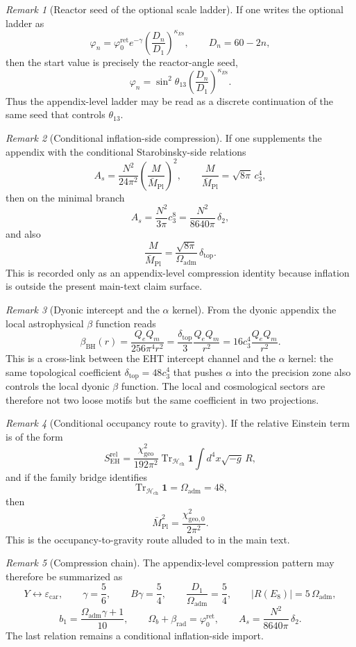 \documentclass[11pt,a4paper]{article}
\theoremstyle{definition}
\theoremstyle{remark}
\newtheorem*{remark}{Remark}
\DeclareMathOperator{\tr}{Tr}
\newcommand{\epscar}{\varepsilon_{\mathrm{car}}}
\newcommand{\Mpl}{\bar M_{\mathrm{Pl}}}
\newcommand{\cthree}{c_3}
\newcommand{\phiz}{\varphi_0^{\mathrm{ret}}}
\newcommand{\deltatop}{\delta_{\mathrm{top}}}
\newcommand{\bone}{b_1}
\newcommand{\Oadm}{\Omega_{\mathrm{adm}}}
\newcommand{\chigeo}{\chi_{\mathrm{geo}}}
\newcommand{\chigeozero}{\chi_{\mathrm{geo},0}}
\begin{document}
\begin{remark}[Reactor seed of the optional scale ladder]
If one writes the optional ladder as
\[
\varphi_n=\phiz e^{-\gamma}\left(\frac{D_n}{D_1}\right)^{\kappa_{E8}},
\qquad
D_n=60-2n,
\]
then the start value is precisely the reactor-angle seed,
\[
\varphi_n=\sin^2\theta_{13}\left(\frac{D_n}{D_1}\right)^{\kappa_{E8}}.
\]
Thus the appendix-level ladder may be read as a discrete continuation of the same seed that controls $\theta_{13}$.
\end{remark}

\begin{remark}[Conditional inflation-side compression]
If one supplements the appendix with the conditional Starobinsky-side relations
\[
A_s=\frac{N^2}{24\pi^2}\left(\frac{M}{\Mpl}\right)^2,
\qquad
\frac{M}{\Mpl}=\sqrt{8\pi}\,\cthree^4,
\]
then on the minimal branch
\[
A_s=\frac{N^2}{3\pi}\cthree^8=\frac{N^2}{8640\pi}\,\delta_2,
\]
and also
\[
\frac{M}{\Mpl}=\frac{\sqrt{8\pi}}{\Oadm}\,\deltatop.
\]
This is recorded only as an appendix-level compression identity because inflation is outside the present main-text claim surface.
\end{remark}

\begin{remark}[Dyonic intercept and the $\alpha$ kernel]
From the dyonic appendix the local astrophysical $\beta$ function reads
\[
\beta_{\mathrm{BH}}(r)=\frac{Q_eQ_m}{256\pi^4 r^2}=\frac{\deltatop}{3}\frac{Q_eQ_m}{r^2}=16\cthree^4\frac{Q_eQ_m}{r^2}.
\]
This is a cross-link between the EHT intercept channel and the $\alpha$ kernel: the same topological coefficient $\deltatop=48\cthree^4$ that pushes $\alpha$ into the precision zone also controls the local dyonic $\beta$ function. The local and cosmological sectors are therefore not two loose motifs but the same coefficient in two projections.
\end{remark}

\begin{remark}[Conditional occupancy route to gravity]
If the relative Einstein term is of the form
\[
S_{\mathrm{EH}}^{\mathrm{rel}}
=
\frac{\chigeo^2}{192\pi^2}\tr_{\mathcal H_{\mathrm{ch}}}\mathbf 1
\int d^4x\sqrt{-g}\,R,
\]
and if the family bridge identifies
\[
\tr_{\mathcal H_{\mathrm{ch}}}\mathbf 1=\Oadm=48,
\]
then
\[
\Mpl^2=\frac{\chigeozero^2}{2\pi^2}.
\]
This is the occupancy-to-gravity route alluded to in the main text.
\end{remark}

\begin{remark}[Compression chain]
The appendix-level compression pattern may therefore be summarized as
\[
Y \leftrightarrow \epscar,
\qquad
\gamma=\frac56,
\qquad
B\gamma=\frac54,
\qquad
\frac{D_1}{\Oadm}=\frac54,
\qquad
|R(E_8)|=5\,\Oadm,
\]
\[
\bone=\frac{\Oadm\gamma+1}{10},
\qquad
\Omega_b+\beta_{\mathrm{rad}}=\phiz,
\qquad
A_s=\frac{N^2}{8640\pi}\,\delta_2.
\]
The last relation remains a conditional inflation-side import.
\end{remark}
\end{document}
